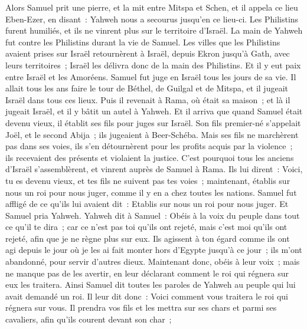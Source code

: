 \begin{multicols}{2}
Alors Samuel prit une pierre, et la mit entre Mitspa et Schen, et il appela ce lieu Eben-Ezer, en disant~: Yahweh nous a secourus jusqu'en ce lieu-ci.
Les Philistins furent humiliés, et ils ne vinrent plus sur le territoire d'Israël. La main de Yahweh fut contre les Philistins durant la vie de Samuel.
Les villes que les Philistins avaient prises sur Israël retournèrent à Israël, depuis Ekron jusqu'à Gath, avec leurs territoires~; Israël les délivra donc de la main des Philistins. Et il y eut paix entre Israël et les Amoréens.
Samuel fut juge en Israël tous les jours de sa vie.
Il allait tous les ans faire le tour de Béthel, de Guilgal et de Mitspa, et il jugeait Israël dans tous ces lieux.
Puis il revenait à Rama, où était sa maison~; et là il jugeait Israël, et il y bâtit un autel à Yahweh.
\VerseOne{}Et il arriva que quand Samuel était devenu vieux, il établit ses fils pour juges sur Israël.
Son fils premier-né s'appelait Joël, et le second Abija~; ils jugeaient à Beer-Schéba.
Mais ses fils ne marchèrent pas dans ses voies, ils s'en détournèrent pour les profits acquis par la violence~; ils recevaient des présents et violaient la justice.
C'est pourquoi tous les anciens d'Israël s'assemblèrent, et vinrent auprès de Samuel à Rama.
Ils lui dirent~: Voici, tu es devenu vieux, et tes fils ne suivent pas tes voies~; maintenant, établis sur nous un roi pour nous juger, comme il y en a chez toutes les nations.
Samuel fut affligé de ce qu'ils lui avaient dit~: Etablis sur nous un roi pour nous juger. Et Samuel pria Yahweh.
Yahweh dit à Samuel~: Obéis à la voix du peuple dans tout ce qu'il te dira~; car ce n'est pas toi qu'ils ont rejeté, mais c'est moi qu'ils ont rejeté, afin que je ne règne plus sur eux.
Ils agissent à ton égard comme ils ont agi depuis le jour où je les ai fait monter hors d'Egypte jusqu'à ce jour~; ils m'ont abandonné, pour servir d'autres dieux.
Maintenant donc, obéis à leur voix~; mais ne manque pas de les avertir, en leur déclarant comment le roi qui régnera sur eux les traitera.
Ainsi Samuel dit toutes les paroles de Yahweh au peuple qui lui avait demandé un roi.
Il leur dit donc~: Voici comment vous traitera le roi qui régnera sur vous. Il prendra vos fils et les mettra sur ses chars et parmi ses cavaliers, afin qu'ils courent devant son char~;

\end{multicols}

